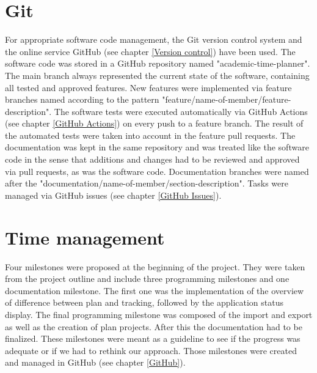 \section{Git}
For appropriate software code management, the Git version control system and the online service GitHub (see chapter \ref{Version control}) have been used. The software code was stored in a GitHub repository named "academic-time-planner". The main branch always represented the current state of the software, containing all tested and approved features. New features were implemented via feature branches named according to the pattern "feature/name-of-member/feature-description". The software tests were executed automatically via GitHub Actions (see chapter \ref{GitHub Actions}) on every push to a feature branch. The result of the automated tests were taken into account in the feature pull requests. The documentation was kept in the same repository and was treated like the software code in the sense that additions and changes had to be reviewed and approved via pull requests, as was the software code. Documentation branches were named after the "documentation/name-of-member/section-description". Tasks were managed via GitHub issues (see chapter \ref{GitHub Issues}).

\section{Time management} \label{Time management}
Four milestones were proposed at the beginning of the project. They were taken from the project outline and include three programming milestones and one documentation milestone. The first one was the implementation of the overview of difference between plan and tracking, followed by the application status display. The final programming milestone was composed of the import and export as well as the creation of plan projects. After this the documentation had to be finalized. These milestones were meant as a guideline to see if the progress was adequate or if we had to rethink our approach. Those milestones were created and managed in GitHub (see chapter \ref{GitHub}). 

